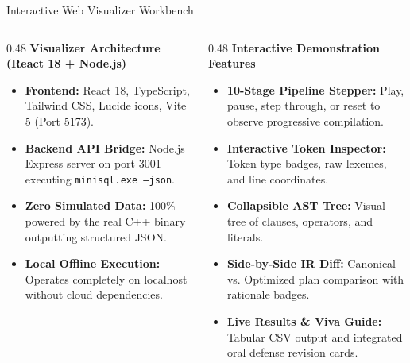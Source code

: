 \documentclass[aspectratio=169,10pt]{beamer}
\begin{document}
\begin{frame}{Interactive Web Visualizer Workbench}
    \begin{columns}[T]
        \begin{column}{0.48\textwidth}
            \textbf{Visualizer Architecture (React 18 + Node.js)}
            \begin{itemize}\footnotesize
                \item \textbf{Frontend:} React 18, TypeScript, Tailwind CSS, Lucide icons, Vite 5 (Port 5173).
                \item \textbf{Backend API Bridge:} Node.js Express server on port 3001 executing \texttt{minisql.exe --json}.
                \item \textbf{Zero Simulated Data:} 100\% powered by the real C++ binary outputting structured JSON.
                \item \textbf{Local Offline Execution:} Operates completely on localhost without cloud dependencies.
            \end{itemize}
        \end{column}
        \begin{column}{0.48\textwidth}
            \textbf{Interactive Demonstration Features}
            \begin{itemize}\footnotesize
                \item \textbf{10-Stage Pipeline Stepper:} Play, pause, step through, or reset to observe progressive compilation.
                \item \textbf{Interactive Token Inspector:} Token type badges, raw lexemes, and line coordinates.
                \item \textbf{Collapsible AST Tree:} Visual tree of clauses, operators, and literals.
                \item \textbf{Side-by-Side IR Diff:} Canonical vs. Optimized plan comparison with rationale badges.
                \item \textbf{Live Results \& Viva Guide:} Tabular CSV output and integrated oral defense revision cards.
            \end{itemize}
        \end{column}
    \end{columns}
\end{frame}
\end{document}
